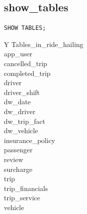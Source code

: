 \documentclass[11pt,a4paper]{article}
\renewcommand{\arraystretch}{1.3}
\begin{document}
\begin{minipage}[t]{.29\linewidth}
\begin{minipage}{\linewidth}
\subsection*{show\_\allowbreak{}tables}
\begin{lstlisting}
SHOW TABLES;
\end{lstlisting}
\par\begingroup\small\noindent
\begin{tabularx}{\linewidth}{Y}
\toprule
Tables\_\allowbreak{}in\_\allowbreak{}ride\_\allowbreak{}hailing\\\midrule
app\_\allowbreak{}user\\
cancelled\_\allowbreak{}trip\\
completed\_\allowbreak{}trip\\
driver\\
driver\_\allowbreak{}shift\\
dw\_\allowbreak{}date\\
dw\_\allowbreak{}driver\\
dw\_\allowbreak{}trip\_\allowbreak{}fact\\
dw\_\allowbreak{}vehicle\\
insurance\_\allowbreak{}policy\\
passenger\\
review\\
surcharge\\
trip\\
trip\_\allowbreak{}financials\\
trip\_\allowbreak{}service\\
vehicle\\
\bottomrule
\end{tabularx}
\par\endgroup
\end{minipage}\par\vspace{5pt}
\end{minipage}\hfill\begin{minipage}[t]{.68\linewidth}\vspace{0pt}\par\noindent\begin{minipage}{\linewidth}\setlength{\parskip}{0pt}\renewcommand{\arraystretch}{1.08}\titlespacing*{\subsection}{0pt}{7pt}{4pt}\lstset{aboveskip=4pt,belowskip=4pt}

\end{minipage}
\end{minipage}
\end{document}
